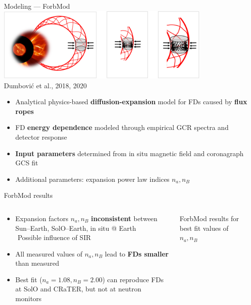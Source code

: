 \documentclass[10pt,aspectratio=169,usenames,dvipsnames]{beamer}
\newcommand{\textarrow}{\,\small\faLongArrowAltRight\,}
\begin{document}
\begin{frame}{Modeling --- ForbMod}
	\centering\includegraphics[width=0.8\textwidth]{images/forbmod_schematic.jpg}\\[-3mm]
	{\footnotesize\flushright Dumbović et al., 2018, 2020}
	
	\begin{itemize}
		\item Analytical physics-based \textbf{diffusion-expansion} model for FDs caused by \textbf{flux ropes}
		\item FD \textbf{energy dependence} modeled through empirical GCR spectra and detector response
		\item \textbf{Input parameters} determined from in situ magnetic field and coronagraph GCS fit
		\item Additional parameters: expansion power law indices $n_a, n_B$ 
	\end{itemize}
\end{frame}

\begin{frame}{ForbMod results}
	\begin{columns}
		\begin{column}{0.4\textwidth}
			\begin{itemize}
				\item Expansion factors $n_a, n_B$ \textbf{inconsistent} between Sun--Earth, SolO--Earth, in situ @ Earth\\
				\small \textarrow Possible influence of SIR
				\item All measured values of $n_a, n_B$ lead to \textbf{FDs smaller} than measured
				\item Best fit ($n_a = 1.08, n_B = 2.00$) can reproduce FDs at SolO and CRaTER, but not at neutron monitors
			\end{itemize}
		\end{column}
		\begin{column}{0.55\textwidth}
			\centering
			\scalebox{0.5}{}
			\footnotesize ForbMod results for best fit values of $n_a, n_B$
		\end{column}
	\end{columns}
\end{frame}
\end{document}

